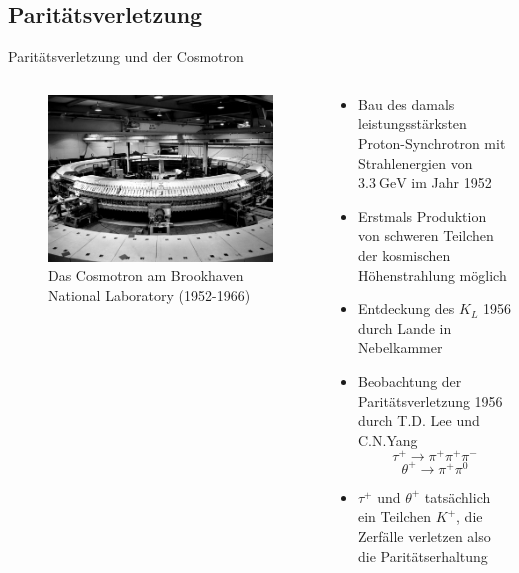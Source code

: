 \documentclass[aspectratio=1610, professionalfonts, 9pt, t]{beamer}
\begin{document}
\subsection{Paritätsverletzung}

  \begin{frame}{Paritätsverletzung und der Cosmotron}
    \begin{columns}[onlytextwidth]
      \begin{column}{0.4\textwidth}
        \begin{figure}[ht]
          \begin{center}
            \includegraphics[height=0.6\textheight]{Images/cosmotron.jpg} %
            \caption{Das Cosmotron am Brookhaven National Laboratory (1952-1966)}
          \end{center}
        \end{figure}
      \end{column}
      \begin{column}{0.5\textwidth}
        \begin{itemize}
          \item Bau des damals leistungsstärksten Proton-Synchrotron mit Strahlenergien von $\SI{3.3}{\giga\electronvolt}$ im Jahr 1952
          \item Erstmals Produktion von schweren Teilchen der kosmischen Höhenstrahlung möglich
          \item Entdeckung des $K_{L}$ 1956 durch Lande in Nebelkammer
          \item Beobachtung der Paritätsverletzung 1956 durch T.D. Lee und C.N.Yang
          \begin{equation*}
            \tau^{+} \rightarrow \pi^{+} \pi^{+} \pi^{-}
          \end{equation*}
          \begin{equation*}
            \theta^{+} \rightarrow \pi^{+} \pi^{0}
          \end{equation*}
          \item $\tau^{+}$ und $\theta^{+}$ tatsächlich ein Teilchen $K^{+}$, die Zerfälle verletzen also die Paritätserhaltung
        \end{itemize}
      \end{column}
    \end{columns}
  \end{frame}
\end{document}

